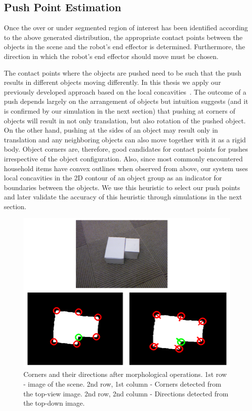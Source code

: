 \subsection{Push Point Estimation}
\label{sec:push-point}
Once the over or under segmented region of interest has been identified 
according to the above generated distribution, the  appropriate contact
points  between the objects in   the   scene  and   the   robot's   end   
effector is determined. Furthermore, the  direction in which  the robot's  end
effector should move must be chosen.

The contact points where the objects are pushed need to
be such that the push results in different objects moving
differently.
In  this thesis we apply our previously developed approach based on 
the local concavities~\cite{bersch12interactive}. The outcome
of a push depends largely on the arrangement of objects but
intuition suggests (and it is confirmed by our simulation in the next section) that pushing at corners of objects will
result in not only translation, but also rotation of the pushed object. On the other hand, pushing at the
sides of an object may result only in translation and any
neighboring objects can also move together with it as a
rigid body. Object corners are, therefore, good candidates for
contact points for pushes irrespective of the object configuration. Also, since most
commonly  encountered  household   items  have  convex  outlines  when
observed  from  above,  our  system  uses  local
concavities in the  2D contour of an object group  as an indicator for
boundaries between the objects.
We use this heuristic to select our push points and later
validate the accuracy of this heuristic through simulations in
the next section.

\begin{figure}[tb!]
   \begin{center}
     \includegraphics[width=.9\columnwidth]{figures/corners.png}
		\vspace{-2ex}
   \caption[Corners and their directions after morphological operations.]{Corners and their directions after morphological operations. 1st row - image of the scene. 2nd row, 1st column - Corners detected from the top-view image. 2nd row, 2nd column - Directions detected from the top-down image. }
   \label{fig:corners}
 \end{center}
 \end{figure}

